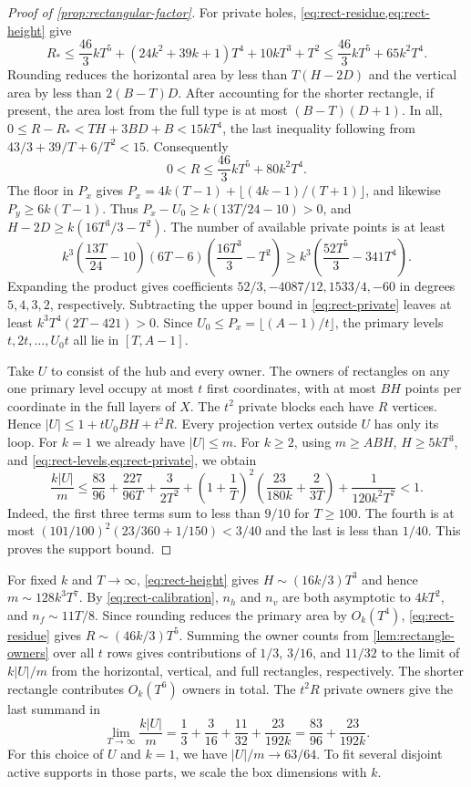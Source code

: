 \documentclass[10pt]{article}
\numberwithin{equation}{section}
\theoremstyle{definition}
\begin{document}
\begin{proof}[Proof of \cref{prop:rectangular-factor}]
For private holes, \cref{eq:rect-residue,eq:rect-height} give
\[
 R_*\le\frac{46}{3}kT^5+(24k^2+39k+1)T^4+10kT^3+T^2
      \le\frac{46}{3}kT^5+65k^2T^4.
\]
Rounding reduces the horizontal area by less than $T(H-2D)$ and the vertical area by less than $2(B-T)D$. After accounting for the shorter rectangle, if present, the area lost from the full type is at most $(B-T)(D+1)$. In all, $0\le R-R_*<TH+3BD+B<15kT^4$, the last inequality following from $43/3+39/T+6/T^2<15$. Consequently
\begin{equation}\label{eq:rect-private}
 0<R\le \frac{46}{3}kT^5+80k^2T^4.
\end{equation}
The floor in $P_x$ gives $P_x=4k(T-1)+\lfloor(4k-1)/(T+1)\rfloor$, and likewise $P_y\ge6k(T-1)$. Thus $P_x-U_0\ge k(13T/24-10)>0$, and $H-2D\ge k(16T^3/3-T^2)$. The number of available private points is at least
\[
 k^3\left(\frac{13T}{24}-10\right)(6T-6)
       \left(\frac{16T^3}{3}-T^2\right)
 \ge k^3\left(\frac{52T^5}{3}-341T^4\right).
\]
Expanding the product gives coefficients $52/3,-4087/12,1533/4,-60$ in degrees $5,4,3,2$, respectively. Subtracting the upper bound in \cref{eq:rect-private} leaves at least $k^3T^4(2T-421)>0$. Since $U_0\le P_x=\lfloor(A-1)/t\rfloor$, the primary levels $t,2t,\ldots,U_0t$ all lie in $[T,A-1]$.

Take $U$ to consist of the hub and every owner. The owners of rectangles on any one primary level occupy at most $t$ first coordinates, with at most $BH$ points per coordinate in the full layers of $X$. The $t^2$ private blocks each have $R$ vertices. Hence $|U|\le 1+tU_0BH+t^2R$. Every projection vertex outside $U$ has only its loop. For $k=1$ we already have $|U|\le m$. For $k\ge2$, using $m\ge ABH$, $H\ge5kT^3$, and \cref{eq:rect-levels,eq:rect-private}, we obtain
\[
 \frac{k|U|}{m}
 \le \frac{83}{96}+\frac{227}{96T}+\frac{3}{2T^2}
   +\left(1+\frac1T\right)^2\left(\frac{23}{180k}+\frac{2}{3T}\right)
   +\frac1{120k^2T^7}<1 .
\]
Indeed, the first three terms sum to less than $9/10$ for $T\ge100$. The fourth is at most $(101/100)^2(23/360+1/150)<3/40$ and the last is less than $1/40$. This proves the support bound.
\end{proof}

For fixed $k$ and $T\to\infty$, \cref{eq:rect-height} gives $H\sim(16k/3)T^3$ and hence $m\sim128k^3T^7$. By \cref{eq:rect-calibration}, $n_h$ and $n_v$ are both asymptotic to $4kT^2$, and $n_f\sim11T/8$. Since rounding reduces the primary area by $O_k(T^4)$, \cref{eq:rect-residue} gives $R\sim(46k/3)T^5$. Summing the owner counts from \cref{lem:rectangle-owners} over all $t$ rows gives contributions of $1/3$, $3/16$, and $11/32$ to the limit of $k|U|/m$ from the horizontal, vertical, and full rectangles, respectively. The shorter rectangle contributes $O_k(T^6)$ owners in total. The $t^2R$ private owners give the last summand in
\[
 \lim_{T\to\infty}\frac{k|U|}{m}
 =\frac13+\frac3{16}+\frac{11}{32}+\frac{23}{192k}
 =\frac{83}{96}+\frac{23}{192k}.
\]
For this choice of $U$ and $k=1$, we have $|U|/m\to63/64$. To fit several disjoint active supports in those parts, we scale the box dimensions with $k$.
\end{document}
